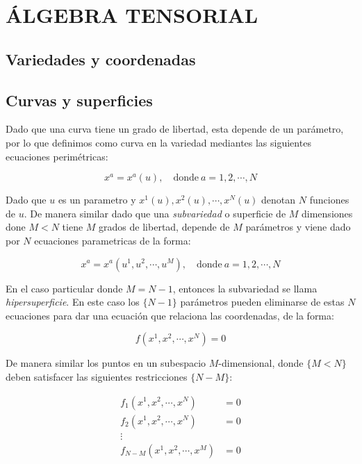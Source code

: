 \documentclass[../main]{subfiles}
\begin{document}
\chapter{ÁLGEBRA TENSORIAL}

\section{Variedades y coordenadas}

\section{Curvas y superficies}

Dado que una curva tiene un grado de libertad, esta depende de un parámetro, por lo que definimos como curva en la variedad mediantes las siguientes ecuaciones perimétricas:

\begin{equation}
    x^a=x^a(u) ,\quad \text{donde} \ a=1,2,\cdots , N
\end{equation}

Dado que $u$ es un parametro y $x^1(u),x^2(u),\cdots,x^N(u)$ denotan $N$ funciones de $u$. De manera similar dado que una \textit{subvariedad} o superficie de $M$ dimensiones done $M<N$ tiene $M$ grados de libertad, depende de $M$ parámetros y viene dado por $N$ ecuaciones parametricas de la forma:

\begin{equation}
    x^a=x^a(u^1,u^2,\cdots,u^M), \quad \text{donde} \ a=1,2,\cdots,N
\end{equation}

En el caso particular donde $M=N-1$, entonces la subvariedad se llama \textit{hipersuperficie}. En este caso los $\{N-1\}$ parámetros pueden eliminarse de estas $N$ ecuaciones para dar una ecuación que relaciona las coordenadas, de la forma:

\begin{equation}
    f(x^1,x^2,\cdots,x^N)=0
\end{equation}

De manera similar los puntos en un subespacio $M$-dimensional, donde $\{M<N\}$ deben satisfacer las siguientes restricciones $\{N-M\}$:

\begin{align}
    f_1(x^1,x^2,\cdots,x^N)&=0 \nonumber \\
    f_2(x^1,x^2,\cdots,x^N)&=0 \nonumber \\
    \vdots \\
    f_{N-M}(x^1,x^2,\cdots,x^M)&=0 \nonumber
\end{align}
\end{document}
